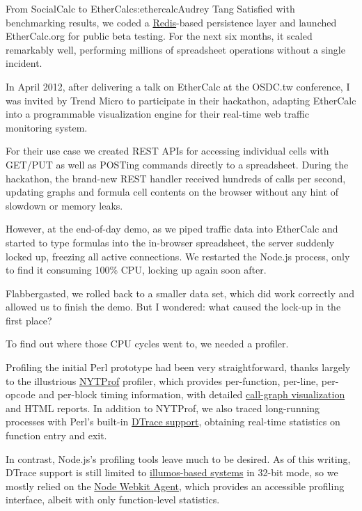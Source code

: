 \begin{aosachapter}{From SocialCalc to EtherCalc}{s:ethercalc}{Audrey Tang}
Satisfied with benchmarking results, we coded a
\href{http://redis.io/}{Redis}-based persistence layer and launched
EtherCalc.org for public beta testing. For the next six months, it
scaled remarkably well, performing millions of spreadsheet operations
without a single incident.

In April 2012, after delivering a talk on EtherCalc at the OSDC.tw
conference, I was invited by Trend Micro to participate in their
hackathon, adapting EtherCalc into a programmable visualization engine
for their real-time web traffic monitoring system.

For their use case we created REST APIs for accessing individual cells
with GET/PUT as well as POSTing commands directly to a spreadsheet.
During the hackathon, the brand-new REST handler received hundreds of
calls per second, updating graphs and formula cell contents on the
browser without any hint of slowdown or memory leaks.

However, at the end-of-day demo, as we piped traffic data into EtherCalc
and started to type formulas into the in-browser spreadsheet, the server
suddenly locked up, freezing all active connections. We restarted the
Node.js process, only to find it consuming 100\% CPU, locking up again
soon after.

Flabbergasted, we rolled back to a smaller data set, which did work
correctly and allowed us to finish the demo. But I wondered: what caused
the lock-up in the first place?


To find out where those CPU cycles went to, we needed a profiler.

Profiling the initial Perl prototype had been very straightforward,
thanks largely to the illustrious
\href{https://metacpan.org/module/Devel::NYTProf}{NYTProf} profiler,
which provides per-function, per-line, per-opcode and per-block timing
information, with detailed
\href{https://metacpan.org/module/nytprofcg}{call-graph visualization}
and HTML reports. In addition to NYTProf, we also traced long-running
processes with Perl's built-in
\href{https://metacpan.org/module/perldtrace}{DTrace support}, obtaining
real-time statistics on function entry and exit.

In contrast, Node.js's profiling tools leave much to be desired. As of
this writing, DTrace support is still limited to
\href{http://blog.nodejs.org/2012/04/25/profiling-node-js/}{illumos-based
systems} in 32-bit mode, so we mostly relied on the
\href{https://github.com/c4milo/node-webkit-agent}{Node Webkit Agent},
which provides an accessible profiling interface, albeit with only
function-level statistics.


\end{aosachapter}
